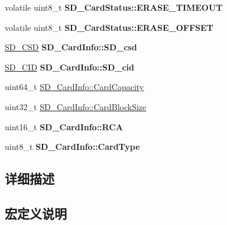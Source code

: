 \begin{DoxyCompactItemize}
\item 
volatile uint8\+\_\+t {\bfseries S\+D\+\_\+\+Card\+Status\+::\+E\+R\+A\+S\+E\+\_\+\+T\+I\+M\+E\+O\+UT}\hypertarget{group__sd__card_ga30eed54506e6f25578ed44ea73d9e960}{}\label{group__sd__card_ga30eed54506e6f25578ed44ea73d9e960}

\item 
volatile uint8\+\_\+t {\bfseries S\+D\+\_\+\+Card\+Status\+::\+E\+R\+A\+S\+E\+\_\+\+O\+F\+F\+S\+ET}\hypertarget{group__sd__card_gafb6673a89a3f6112ff752c2fef0002df}{}\label{group__sd__card_gafb6673a89a3f6112ff752c2fef0002df}

\item 
\hyperlink{struct_s_d___c_s_d}{S\+D\+\_\+\+C\+SD} {\bfseries S\+D\+\_\+\+Card\+Info\+::\+S\+D\+\_\+csd}\hypertarget{group__sd__card_ga03390f9fae0ea5c3bd57194272d565db}{}\label{group__sd__card_ga03390f9fae0ea5c3bd57194272d565db}

\item 
\hyperlink{struct_s_d___c_i_d}{S\+D\+\_\+\+C\+ID} {\bfseries S\+D\+\_\+\+Card\+Info\+::\+S\+D\+\_\+cid}\hypertarget{group__sd__card_gae8074beb30b2ce80f4f24fb9c2895329}{}\label{group__sd__card_gae8074beb30b2ce80f4f24fb9c2895329}

\item 
uint64\+\_\+t \hyperlink{group__sd__card_ga536fbe580a6c824e73a2c3c4cf5b40c6}{S\+D\+\_\+\+Card\+Info\+::\+Card\+Capacity}
\item 
uint32\+\_\+t \hyperlink{group__sd__card_ga610fdab86929f0fc26881d564b19d609}{S\+D\+\_\+\+Card\+Info\+::\+Card\+Block\+Size}
\item 
uint16\+\_\+t {\bfseries S\+D\+\_\+\+Card\+Info\+::\+R\+CA}\hypertarget{group__sd__card_gabfc547297bf8e2b1713dc3072300b7e0}{}\label{group__sd__card_gabfc547297bf8e2b1713dc3072300b7e0}

\item 
uint8\+\_\+t {\bfseries S\+D\+\_\+\+Card\+Info\+::\+Card\+Type}\hypertarget{group__sd__card_ga4e81c89d9a913a4dd5e81b9f8856ea96}{}\label{group__sd__card_ga4e81c89d9a913a4dd5e81b9f8856ea96}

\end{DoxyCompactItemize}


\subsection{详细描述}


\subsection{宏定义说明}
